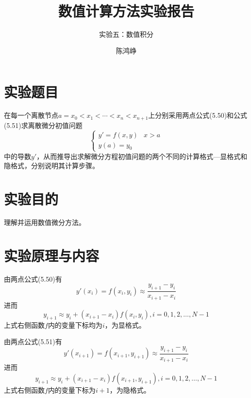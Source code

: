 \documentclass[reportComp]{thesis}
\title{数值计算方法实验报告}
\subtitle{实验五：数值积分}
\author{陈鸿峥}
\begin{document}
\maketitle

\section{实验题目}
在每一个离散节点$a=x_0<x_1<\cdots<x_n<x_{n+1}$上分别采用两点公式(5.50)和公式(5.51)求离散微分初值问题
\[\begin{cases}
y'=f(x,y) & x>a\\
y(a)=y_0
\end{cases}\]
中的导数$y'$，从而推导出求解微分方程初值问题的两个不同的计算格式---显格式和隐格式，分别说明其计算步骤。

\section{实验目的}
理解并运用数值微分方法。

\section{实验原理与内容}
由两点公式(5.50)有
\[y'(x_i)=f(x_i,y_i)\approx\frac{y_{i+1}-y_i}{x_{i+1}-x_i}\]
进而
\[y_{i+1}\approx y_i+(x_{i+1}-x_i)f(x_i,y_i),i=0,1,2,\ldots,N-1\]
上式右侧函数$f$内的变量下标均为$i$，为显格式。

由两点公式(5.51)有
\[y'(x_{i+1})=f(x_{i+1},y_{i+1})\approx\frac{y_{i+1}-y_i}{x_{i+1}-x_i}\]
进而
\[y_{i+1}\approx y_i+(x_{i+1}-x_i)f(x_{i+1},y_{i+1}),i=0,1,2,\ldots,N-1\]
上式右侧函数$f$内的变量下标为$i+1$，为隐格式。
\end{document}
